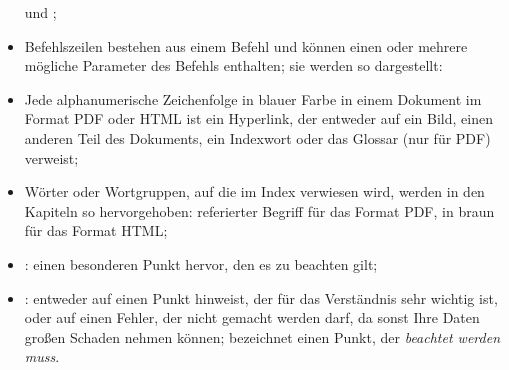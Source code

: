 \begin{itemize}
		\newline
		\hspace*{1.5cm} und ;	
	\item Befehlszeilen bestehen aus einem Befehl und können einen oder mehrere mögliche Parameter des Befehls enthalten; sie werden so dargestellt:%
		\newline
		\hspace*{1.5cm}	
	\item Jede alphanumerische Zeichenfolge in blauer Farbe in einem Dokument im Format \gls{PDF} oder \gls{HTML} ist ein Hyperlink, der entweder auf ein Bild, einen anderen Teil des Dokuments, ein Indexwort oder das Glossar (nur für \gls{PDF}) verweist;%
	\item Wörter oder Wortgruppen, auf die im Index verwiesen wird, werden in den Kapiteln so hervorgehoben:%
		\newline
		\hspace*{1.5cm} \textopenbullet{}	\textsf{referierter Begriff} für das Format \gls{PDF}, %
		\newline 
		\hspace*{1.5cm} \textopenbullet{} in braun für das Format \gls{HTML};%
	\item \Note{}: einen besonderen Punkt hervor, den es zu beachten gilt;
	\item \Attention{}: entweder auf einen Punkt hinweist, der für das Verständnis sehr wichtig ist, oder auf einen Fehler, der nicht gemacht werden darf, da sonst Ihre Daten großen Schaden nehmen können;\newline
	\Attention{} bezeichnet einen Punkt, der \emph{beachtet werden muss}.
\end{itemize}


